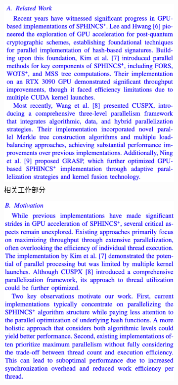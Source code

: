 \documentclass[report]{../../custom}
\begin{document}
\begin{figure}[ht]
\centering
\begin{subfigure}[b]{0.32\textwidth}
\centering
\includegraphics[width=\textwidth]{./fig/relate_work.png}
\caption{相关工作部分}
\label{fig:related_work}
\end{subfigure}\hfill
\begin{subfigure}[b]{0.32\textwidth}
\centering
\includegraphics[width=\textwidth]{./fig/motivation.png}

\end{subfigure}
\end{figure}
\end{document}
